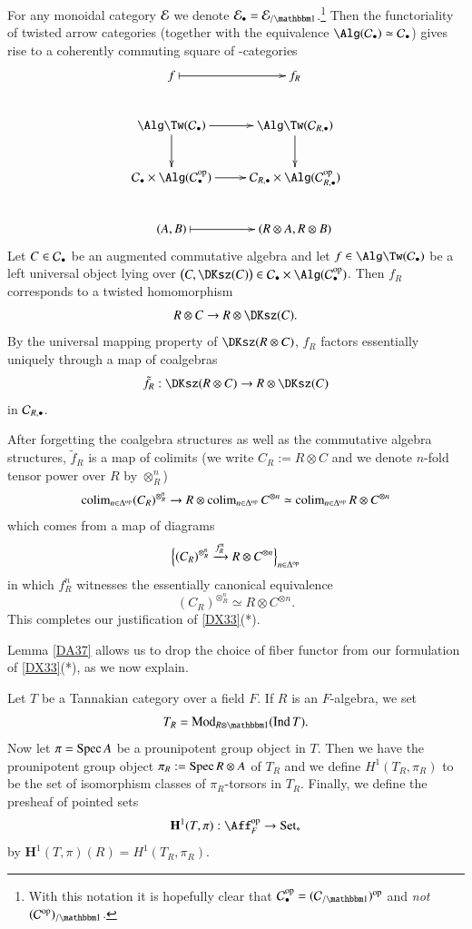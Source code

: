 \sspar{}\label{IA56}
For any monoidal category $\mathcal{E}$ we denote $\Ee_\bullet = \Ee_{/\one}$.\footnote{With this notation it is hopefully clear that $\Cc_\bullet\op = (\Cc_{/\one})\op$ and \emph{not} $(\Cc\op)_{/\one}$.} Then the functoriality of twisted arrow categories (together with the equivalence $\Alg(\Cc_\bullet) \simeq \Cc_\bullet$) gives rise to a coherently commuting square of \oo-categories
\[
\xymatrix{
f \ar@{|->}[r] & f_R
\\
\Alg \Tw (\Cc_\bullet) \ar[d] \ar[r] &
\Alg \Tw (\Cc_{R,\bullet}) \ar[d] 
\\
\Cc_\bullet \times \Alg(\Cc_\bullet\op) \ar[r] &
\Cc_{R,\bullet} \times \Alg(\Cc_{R, \bullet}\op)
\\
(A,B) \ar@{|->}[r] & (R \otimes A, R\otimes B)
}
\]
Let $C \in \mathcal{C}_\bullet$ be an augmented commutative algebra and let $f \in \Alg \Tw(\Cc_\bullet)$ be a left universal object lying over $\big(C, \DKsz(C)\big) \in \Cc_\bullet \times \Alg(\Cc_\bullet\op)$. Then $f_R$ corresponds to a twisted homomorphism 
\[
R \otimes C \to R \otimes \DKsz(C).
\]
By the universal mapping property of $\DKsz(R \otimes C)$, $f_R$ factors essentially uniquely through a map of coalgebras 
\[
\tilde f_R: \DKsz(R\otimes C) \to R \otimes \DKsz(C)
\]
in $\mathcal{C}_{R,\bullet}$.


\sspar{}\label{IA57}
After forgetting the coalgebra structures as well as the commutative algebra structures, $\tilde f_R$ is a map of colimits (we write $C_R := R \otimes C$ and we denote $n$-fold tensor power over $R$ by $\otimes_R^n$)
\[
\operatorname{colim}_{n \in \Delta^{\mathrm{op}}} (C_R)^{\otimes_R ^n}
\to
R \otimes \operatorname{colim}_{n \in \Delta^{\mathrm{op}}} C^{\otimes n}
\simeq
\operatorname{colim}_{n \in \Delta^{\mathrm{op}}} R \otimes  C^{\otimes n}
\]
which comes from a map of diagrams
\[
\Big\{
(C_R)^{\otimes_R ^n} 
\xrightarrow{f_R^n}
R \otimes C^{\otimes n}
\Big\}_{n \in \Delta^{\mathrm{op}}}
\]
in which $f_R^n$ witnesses the essentially canonical equivalence
\[
(C_R)^{\otimes_R ^n} 
\simeq
R \otimes C^{\otimes n}.
\]
This completes our justification of \ref{DX33}(*). 

\medskip

Lemma \ref{DA37} allows us to drop the choice of fiber functor from our formulation of \ref{DX33}(*), as we now explain.

\begin{ssDefinition}
\label{DA40}
Let $T$ be a Tannakian category over a field $F$. If $R$ is an $F$-algebra, we set
\[
T_R = \Mod_{R \otimes \one}(\Ind T).
\]
Now let $\pi = \operatorname{Spec} A$ be a prounipotent group object in $T$. Then we have the prounipotent group object $\pi_R := \operatorname{Spec} R \otimes A$ of $T_R$ and we define $H^1(T_R, \pi_R)$ to be the set of isomorphism classes of $\pi_R$-torsors in $T_R$. Finally, we define the presheaf of pointed sets
\[
\mathbf{H}^1(T, \pi): \Aff_F\op \to \Set_\ast
\]
by $\mathbf{H}^1(T, \pi)(R) = H^1(T_R, \pi_R)$.
\end{ssDefinition}

